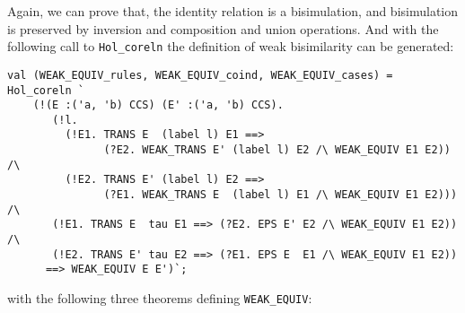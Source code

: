 Again, we can prove that, the identity
relation is a bisimulation, and bisimulation is preserved by inversion
and composition and union operations. And with the following call to
\texttt{Hol_coreln} the definition of weak bisimilarity can be generated:
\begin{lstlisting}
val (WEAK_EQUIV_rules, WEAK_EQUIV_coind, WEAK_EQUIV_cases) = Hol_coreln `
    (!(E :('a, 'b) CCS) (E' :('a, 'b) CCS).
       (!l.
         (!E1. TRANS E  (label l) E1 ==>
               (?E2. WEAK_TRANS E' (label l) E2 /\ WEAK_EQUIV E1 E2)) /\
         (!E2. TRANS E' (label l) E2 ==>
               (?E1. WEAK_TRANS E  (label l) E1 /\ WEAK_EQUIV E1 E2))) /\
       (!E1. TRANS E  tau E1 ==> (?E2. EPS E' E2 /\ WEAK_EQUIV E1 E2)) /\
       (!E2. TRANS E' tau E2 ==> (?E1. EPS E  E1 /\ WEAK_EQUIV E1 E2))
      ==> WEAK_EQUIV E E')`;
\end{lstlisting}
with the following three theorems defining \texttt{WEAK_EQUIV}:
